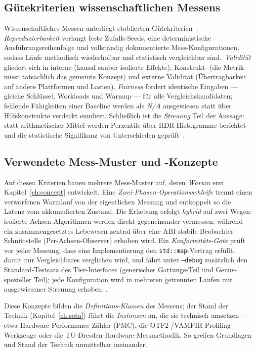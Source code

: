 \subsection{Gütekriterien wissenschaftlichen Messens}\label{ssec:measurement-criteria}
Wissenschaftliches Messen unterliegt etablierten Gütekriterien~\cite{hoefler2015benchmarking}.
\emph{Reproduzierbarkeit} verlangt feste Zufalls-Seeds, eine deterministische Ausführungsreihenfolge
und vollständig dokumentierte Mess-Konfigurationen, sodass Läufe methodisch wiederholbar und
statistisch vergleichbar sind.\ \emph{Validität} gliedert sich in interne (kausal sauber isolierte
Effekte), Konstrukt- (die Metrik misst tatsächlich das gemeinte Konzept) und externe Validität
(Übertragbarkeit auf andere Plattformen und Lasten)\@. \emph{Fairness} fordert identische Eingaben ---
gleiche Schlüssel, Workloads und Warmup --- für alle Vergleichskandidaten; fehlende Fähigkeiten
einer Baseline werden als \emph{N/A} ausgewiesen statt über Hilfskonstrukte verdeckt emuliert.
Schließlich ist die \emph{Streuung} Teil der Aussage: statt arithmetischer Mittel werden Perzentile
über HDR-Histogramme berichtet und die statistische Signifikanz von Unterschieden
geprüft~\cite{hoefler2015benchmarking}.

\subsection{Verwendete Mess-Muster und -Konzepte}\label{ssec:measurement-patterns}
Auf diesen Kriterien bauen mehrere Mess-Muster auf, deren \emph{Warum} erst Kapitel~\ref{ch:concept}
entwickelt. Eine \emph{Zwei-Phasen-Operationsschleife} trennt einen verworfenen Warmlauf von der
eigentlichen Messung und entkoppelt so die Latenz vom akkumulierten Zustand. Die Erhebung erfolgt
\emph{hybrid} auf zwei Wegen: isolierte Achsen-Algorithmen werden direkt gegeneinander vermessen,
während ein zusammengesetztes Lebewesen zentral über eine ABI-stabile Beobachter-Schnittstelle
(Per-Achsen-Observer) erhoben wird. Ein \emph{Konformitäts-Gate} prüft vor jeder Messung, dass
eine Implementierung den \texttt{std::map}-Vertrag erfüllt, damit nur Vergleichbares verglichen
wird, und fährt unter \texttt{--debug} zusätzlich den Standard-Testsatz des Tier-Interfaces (generischer
Gattungs-Teil und Genus-spezieller Teil); jede Konfiguration wird in mehreren getrennten Läufen mit
ausgewiesener Streuung erhoben~\cite{hoefler2015benchmarking}.

Diese Konzepte bilden die \emph{Definitions-Klassen} des Messens; der Stand der Technik
(Kapitel~\ref{ch:sota}) führt die \emph{Instanzen} an, die sie technisch umsetzen --- etwa
Hardware-Performance-Zähler (PMC), die OTF2-/VAMPIR-Profiling-Werkzeuge oder die
TU-Dresden-Hardware-Messmethodik. So greifen Grundlagen und Stand der Technik unmittelbar
ineinander.

